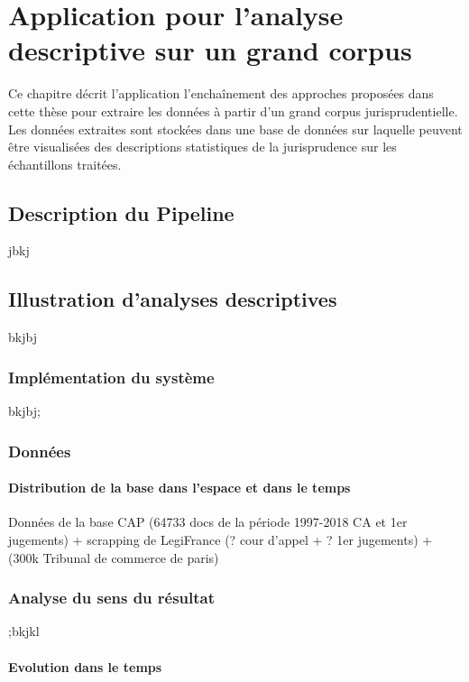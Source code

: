 \chapter{Application pour l'analyse descriptive sur un grand corpus}
\label{chap:demo}
Ce chapitre décrit l'application l'enchaînement des approches proposées dans cette thèse pour extraire les données à partir d'un grand corpus jurisprudentielle. Les données extraites sont stockées dans une base de données sur laquelle peuvent être visualisées des descriptions statistiques de la jurisprudence sur les échantillons traitées.
 
 
\section{Description du Pipeline}
\label{sec:demo:motivation}

jbkj

\section{Illustration d'analyses descriptives}
\label{sec:demo:experimentations}

bkjbj


\subsection{Implémentation du système}

bkjbj;


\subsection{Données}
\subsubsection{Distribution de la base dans l'espace et dans le temps}

Données de la base CAP (64733 docs de la période 1997-2018 CA et 1er jugements) + scrapping de LegiFrance (? cour d'appel + ? 1er jugements) +  (300k Tribunal de commerce de paris)


\subsection{Analyse du sens du résultat}
;bkjkl
\subsubsection{Evolution dans le temps}
